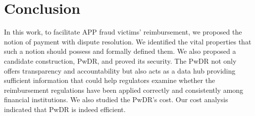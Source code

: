 
 \vspace{-2.5mm}
\section{Conclusion}\label{sec::conclusion}
\vspace{-1mm}



In this work, to facilitate APP fraud victims’ reimbursement,  we proposed the notion of payment with dispute resolution. We identified the vital properties that such a notion should possess and formally defined them. We also proposed a candidate construction,  PwDR, and proved its security.  The PwDR not only offers transparency and accountability but also acts as a data hub providing sufficient information that could help regulators examine whether the reimbursement regulations have been applied correctly and consistently among financial institutions.  We also studied the PwDR's cost. Our cost analysis indicated that PwDR is indeed efficient. 

 \vspace{-2mm}




